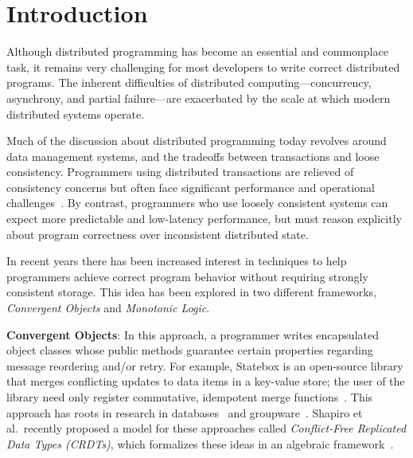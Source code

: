 \section{Introduction} 
\label{sec:intro} 
Although distributed programming has become an essential and commonplace task,
it remains very challenging for most developers to write correct distributed
programs. The inherent difficulties of distributed computing---concurrency,
asynchrony, and partial failure---are exacerbated by the scale at which modern
distributed systems operate.

Much of the discussion about distributed programming today revolves around data
management systems, and the tradeoffs between transactions and loose
consistency. Programmers using distributed transactions are relieved of
consistency concerns but often face significant performance and operational
challenges~\cite{Birman2009}. By contrast, programmers who use loosely
consistent systems can expect more predictable and low-latency performance, but
must reason explicitly about program correctness over inconsistent distributed
state.

In recent years there has been increased interest in techniques to help programmers achieve correct program behavior without requiring strongly consistent storage. This idea has been explored in two different frameworks, \emph{Convergent Objects} and \emph{Monotonic Logic}.

\vspace{0.5em}
\noindent \textbf{Convergent Objects}: In this approach, a programmer writes encapsulated object classes whose public methods guarantee certain properties regarding message reordering and/or retry. For example, Statebox is an open-source library that merges conflicting updates to data items in a key-value store; the user of the library need only register commutative, idempotent merge functions~\cite{statebox}. This approach has roots in research in databases~\cite{Farrag1989,Garcia-Molina1983,Helland2009} and groupware~\cite{Ellis1989,Sun1998}.  Shapiro et al.\ recently proposed a model for these approaches called {\em Conflict-Free Replicated Data Types (CRDTs)}, which formalizes these ideas in an algebraic framework~\cite{Shapiro2011b}. 


